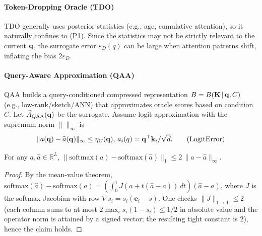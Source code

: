 \paragraph{Token-Dropping Oracle (TDO)}
TDO generally uses posterior statistics (e.g., age, cumulative attention), so it naturally confines to (P1). Since the statistics may not be strictly relevant to the current $\mathbf{q}$, the surrogate error $\varepsilon_{D}(q)$ can be large when attention patterns shift, inflating the bias $2\varepsilon_{D}$.

\paragraph{Query-Aware Approximation (QAA)}
QAA builds a query-conditioned compressed representation $B=B(\mathbf{K}\,|\,\mathbf{q},C)$ (e.g., low-rank/sketch/ANN) that approximates oracle scores based on condition $C$. Let $\widehat A_{\text{QAA}}(\mathbf{q})$ be the surrogate. Assume logit approximation with the supremum norm $\| \|_\infty$ is
\begin{equation}
\|a(\mathbf{q})-\widehat a(\mathbf{q})\|_\infty \le \eta_C(\mathbf{q}),\,
a_i(q)=\mathbf{q}^\top \mathbf{k}_i/\sqrt d.
\tag{LogitError}
\end{equation}
\begin{lemma}
\label{lem:softmaxLip}
For any $a,\widehat a\in\mathbb R^L$, $\|\mathrm{softmax}(a)-\mathrm{softmax}(\widehat a)\|_1 \le 2\,\|a-\widehat a\|_\infty$.
\begin{proof}
By the mean-value theorem,
$\mathrm{softmax}(\widehat a)-\mathrm{softmax}(a)
=\left(\int_0^1 J(a+t(\widehat a-a))\,dt\right)(\widehat a-a)$,
where $J$ is the softmax Jacobian with row $\nabla s_i = s_i(\mathbf e_i - s)$.
One checks $\|J\|_{1\to 1}\le 2$ (each column sums to at most $2\max_i s_i(1-s_i)\le 1/2$ in absolute value and the operator norm is attained by a signed vector; the resulting tight constant is $2$), hence the claim holds.
\end{proof}
\end{lemma}


